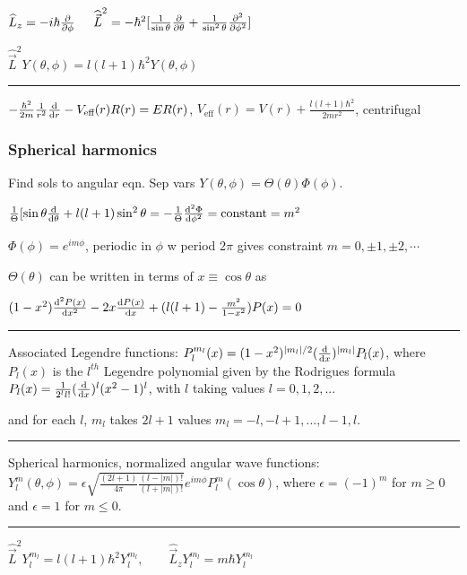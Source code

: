 $\widehat{L}_z = -i \hbar \pdv{}{\phi} \quad$
$\widehat{\vec{L}}^2 = -\hbar^2 [\frac{1}{\sin \theta} \pdv{}{\theta} (\sin \theta \pdv{}{\theta}) + \frac{1}{\sin^2 \theta} \pdv[2]{}{\phi}]$

$\widehat{\vec{L}}^2 Y(\theta, \phi) = l (l+1) \hbar^2 Y(\theta, \phi)$

\hrule height 0.1pt

$-\frac{\hbar^2}{2m} \frac{1}{r^2} \dv{}{r} (r^2 \dv{R(r)}{r}) - V_{\textrm{eff}}(r) R(r) = ER(r)$, $V_{\textrm{eff}}(r) = V(r) + \frac{l(l+1) \hbar^2}{2mr^2}$, centrifugal

\subsubsection{Spherical harmonics}

Find sols to angular eqn. Sep vars $Y(\theta, \phi) = \Theta(\theta) \Phi(\phi)$.

$\frac{1}{\Theta} [\sin\theta \dv{}{\theta} (\sin \theta \dv{\Theta}{\theta}) + l(l+1) \sin^2 \theta = - \frac{1}{\Theta} \dv[2]{\Phi}{\phi} = \textrm{constant} = m^2$

$\Phi(\phi) = e^{im\phi}$, periodic in $\phi$ w period $2 \pi$ gives constraint $m = 0, \pm 1, \pm 2, \cdots$

$\Theta(\theta)$ can be written in terms of $x \equiv \cos \theta$ as

$(1 - x^2) \dv[2]{P(x)}{x} - 2x \dv{P(x)}{x} + (l(l+1) - \frac{m^2}{1-x^2}) P(x) = 0$

\hrule height 0.1pt

Associated Legendre functions: $P_l^{m_l}(x) = (1-x^2)^{|m_l|/2} (\dv{}{x})^{|m_l|} P_l(x)$,
where $P_l(x)$ is the $l^{th}$ Legendre polynomial given by the Rodrigues formula $P_l(x) = \frac{1}{2^l l!} (\dv{}{x})^l (x^2 - 1)^l$, with $l$ taking values $l=0, 1, 2, ...$

and for each $l$, $m_l$ takes $2l + 1$ values $m_l = -l, -l+1, ..., l-1, l$.

\hrule height 0.1pt

Spherical harmonics, normalized angular wave functions: $Y_l^m (\theta, \phi) = \epsilon \sqrt{\frac{(2l+1)}{4 \pi} \frac{(l-|m|)!}{(l+|m|)!}} e^{im \phi} P_l^m (\cos \theta)$, where $\epsilon = (-1)^m$ for $m \geq 0$ and $\epsilon = 1$ for $m \leq 0$. 

\hrule height 0.1pt

$\widehat{\vec{L}}^2 Y_l^{m_l} = l(l+1) \hbar^2 Y_l^{m_l}, \qquad \widehat{\vec{L}}_z Y_l^{m_l} = m \hbar Y_l^{m_l}$

